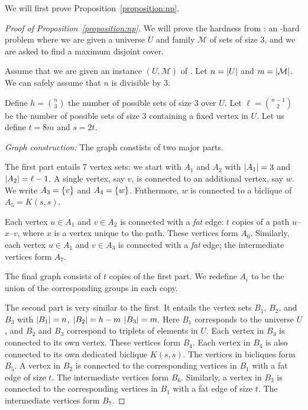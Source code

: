 
We will first prove Proposition~\ref{proposition:np}.

\begin{proof}[Proof of Proposition~\ref{proposition:np}]
We will prove the hardness from \tmatch: an \np-hard problem where we are given
a universe $U$ and family $\mathcal{M}$ of sets of size $3$, and we are asked
to find a maximum disjoint cover. 

Assume that we are given an instance $(U, \mathcal{M})$ of \tmatch.  Let $n =
{\left|U\right|}$ and $m = {\left|\mathcal{M}\right|}$. We can safely assume that $n$ is divisible by 3.

Define $h = {n \choose 3}$ the number of possible
sets of size $3$ over $U$. Let $\ell = {n - 1 \choose 2}$ be the number of possible
sets of size $3$ containing a fixed vertex in $U$.
Let us define $t = 8m$ and $s = 2t$.

\emph{Graph construction:}
The graph constists of two major parts.

The first part entails 7 vertex sets: we start with $A_1$ and $A_2$ with ${\left|A_1\right|} = 3$ and ${\left|A_2\right|}
= \ell - 1$.
A single vertex, say $v$, 
is connected to an additional vertex, say $w$. We write $A_3 = \left\{v\right\}$ and $A_4 = \left\{w\right\}$.
Futhermore, $w$ is connected to a biclique of $A_5 = K(s, s)$.

Each vertex $u \in A_1$ and $v \in A_2$ is connected with a \emph{fat} edge:
$t$ copies of a path $u$--$x$--$v$, where $x$ is a vertex unique to the path.
These vertices form $A_6$.
Similarly, each vertex $u \in A_1$ and $v \in A_3$ is connected with a \emph{fat} edge;
the intermediate vertices form $A_7$.


The final graph consists of $t$ copies of the first part. We redefine $A_i$ to be
the union of the corresponding groups in each copy.

The second part is very similar to the first.  It entails the vertex sets
$B_1$, $B_2$, and $B_3$ with ${\left|B_1\right|} = n$, ${\left|B_2\right|} = h - m$ ${\left|B_3\right|} = m$.
Here $B_1$ corresponds to the universe $U$, and $B_2$ and $B_3$ correspond to
triplets of elements in $U$. Each vertex in $B_3$ is connected to its own vertex.
These vertices form $B_4$. Each vertex in $B_4$ is also connected to its own dedicated biclique
$K(s, s)$. The vertices in bicliques form $B_5$.
A vertex in $B_2$ is connected to the corresponding vertices in $B_1$ with a fat edge
of size $t$. The intermediate vertices form $B_6$.
Similarly, a vertex in $B_3$ is connected to the corresponding vertices in $B_1$ with a fat edge
of size $t$. The intermediate vertices form $B_7$.




\end{proof}
